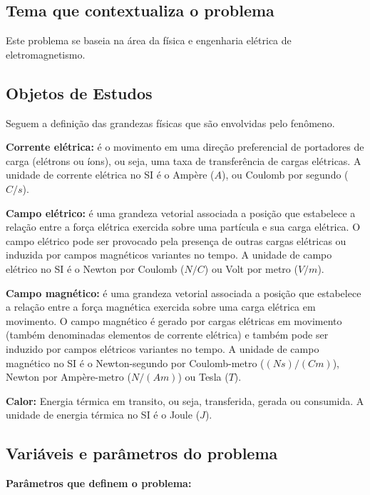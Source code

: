 \documentclass[
	article,			%
	11pt,				%
	oneside,			%
	a4paper,			%
	english,			%
	brazil,				%
	sumario=tradicional
	]{abntex2}
\begin{document}
\subsection{Tema que contextualiza o problema}

Este problema se baseia na área da física e engenharia elétrica de eletromagnetismo.

\subsection{Objetos de Estudos}

Seguem a definição das grandezas físicas que são envolvidas pelo fenômeno.



\textbf{Corrente elétrica:} é o movimento em uma direção preferencial de portadores de carga (elétrons ou íons), ou seja, uma taxa de transferência de cargas elétricas. A unidade de corrente elétrica no SI é o Ampère ($ A $), ou Coulomb por segundo ($ C/s $). \cite{keller:1998}

\textbf{Campo elétrico:} é uma grandeza vetorial associada a posição que estabelece a relação entre a força elétrica exercida sobre uma partícula e sua carga elétrica. O campo elétrico pode ser provocado pela presença de outras cargas elétricas ou induzida por campos magnéticos variantes no tempo. A unidade de campo elétrico no SI é o Newton por Coulomb ($ N/C $) ou Volt por metro ($ V/m $). \cite{keller:1998}

\textbf{Campo magnético:} é uma grandeza vetorial associada a posição que estabelece a relação entre a força magnética exercida sobre uma carga elétrica em movimento. O campo magnético é gerado por cargas elétricas em movimento (também denominadas elementos de corrente elétrica) e também pode ser induzido por campos elétricos variantes no tempo. A unidade de campo magnético no SI é o Newton-segundo por Coulomb-metro ($ (Ns)/(Cm) $), Newton por Ampère-metro ($ N/(Am) $) ou Tesla ($ T $). \cite{keller:1998}

\textbf{Calor:} Energia térmica em transito, ou seja, transferida, gerada ou consumida. A unidade de energia térmica no SI é o Joule ($ J $).

\subsection{Variáveis e parâmetros do problema}

\textbf{Parâmetros que definem o problema:}
\end{document}
